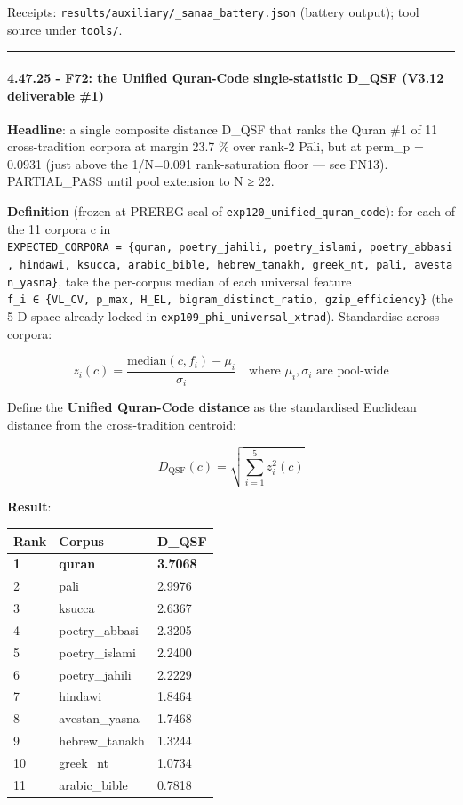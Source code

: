 \documentclass[
]{article}
\newcounter{none} %
\begin{document}
Receipts: \texttt{results/auxiliary/\_sanaa\_battery.json} (battery
output); tool source under \texttt{tools/}.

\begin{center}\rule{0.5\linewidth}{0.5pt}\end{center}

\paragraph{4.47.25 - F72: the Unified Quran-Code single-statistic D\_QSF
(V3.12 deliverable
\#1)}\label{f72-the-unified-quran-code-single-statistic-d_qsf-v3.12-deliverable-1}

\textbf{Headline}: a single composite distance D\_QSF that ranks the
Quran \#1 of 11 cross-tradition corpora at margin 23.7 \% over rank-2
Pāli, but at perm\_p = 0.0931 (just above the 1/N=0.091 rank-saturation
floor --- see FN13). PARTIAL\_PASS until pool extension to N ≥ 22.

\textbf{Definition} (frozen at PREREG seal of
\texttt{exp120\_unified\_quran\_code}): for each of the 11 corpora c in
\texttt{EXPECTED\_CORPORA\ =\ \{quran,\ poetry\_jahili,\ poetry\_islami,\ poetry\_abbasi,\ hindawi,\ ksucca,\ arabic\_bible,\ hebrew\_tanakh,\ greek\_nt,\ pali,\ avestan\_yasna\}},
take the per-corpus median of each universal feature
\texttt{f\_i\ ∈\ \{VL\_CV,\ p\_max,\ H\_EL,\ bigram\_distinct\_ratio,\ gzip\_efficiency\}}
(the 5-D space already locked in
\texttt{exp109\_phi\_universal\_xtrad}). Standardise across corpora:

\[z_i(c) = \frac{\text{median}(c, f_i) - \mu_i}{\sigma_i} \quad \text{where } \mu_i, \sigma_i \text{ are pool-wide}\]

Define the \textbf{Unified Quran-Code distance} as the standardised
Euclidean distance from the cross-tradition centroid:

\[D_{\text{QSF}}(c) = \sqrt{\sum_{i=1}^{5} z_i^2(c)}\]

\textbf{Result}:

{\def\LTcaptype{none} %
\begin{longtable}[]{@{}lll@{}}
\toprule\noalign{}
Rank & Corpus & D\_QSF \\
\midrule\noalign{}
\endhead
\bottomrule\noalign{}
\endlastfoot
\textbf{1} & \textbf{quran} & \textbf{3.7068} \\
2 & pali & 2.9976 \\
3 & ksucca & 2.6367 \\
4 & poetry\_abbasi & 2.3205 \\
5 & poetry\_islami & 2.2400 \\
6 & poetry\_jahili & 2.2229 \\
7 & hindawi & 1.8464 \\
8 & avestan\_yasna & 1.7468 \\
9 & hebrew\_tanakh & 1.3244 \\
10 & greek\_nt & 1.0734 \\
11 & arabic\_bible & 0.7818 \\
\end{longtable}
}
\end{document}
